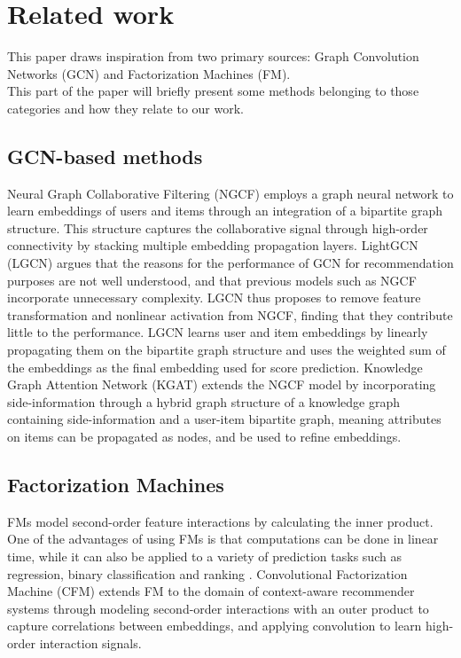 \section{Related work}\label{sec:relatedwork}
This paper draws inspiration from two primary sources: Graph Convolution Networks (GCN) and Factorization Machines (FM).\\
This part of the paper will briefly present some methods belonging to those categories and how they relate to our work.

\subsection{GCN-based methods}
Neural Graph Collaborative Filtering (NGCF) \cite{NGCF} employs a graph neural network to learn embeddings of users and items through an integration of a bipartite graph structure.
This structure captures the collaborative signal through high-order connectivity by stacking multiple embedding propagation layers.
LightGCN (LGCN) \cite{LightGCN} argues that the reasons for the performance of GCN for recommendation purposes are not well understood, and that previous models such as NGCF incorporate unnecessary complexity.
LGCN thus proposes to remove feature transformation and nonlinear activation from NGCF, finding that they contribute little to the performance.
LGCN learns user and item embeddings by linearly propagating them on the bipartite graph structure and uses the weighted sum of the embeddings as the final embedding used for score prediction.
Knowledge Graph Attention Network (KGAT) \cite{KGAT} extends the NGCF model by incorporating side-information through a hybrid graph structure of a knowledge graph containing side-information and a user-item bipartite graph, meaning attributes on items can be propagated as nodes, and be used to refine embeddings.

\subsection{Factorization Machines}
FMs \cite{fmrendle} model second-order feature interactions by calculating the inner product.
One of the advantages of using FMs is that computations can be done in linear time, while it can also be applied to a variety of prediction tasks such as regression, binary classification and ranking \cite{fmrendle}.
Convolutional Factorization Machine (CFM) \cite{CFM} extends FM to the domain of context-aware recommender systems through modeling second-order interactions with an outer product to capture correlations between embeddings, and applying convolution to learn high-order interaction signals.
